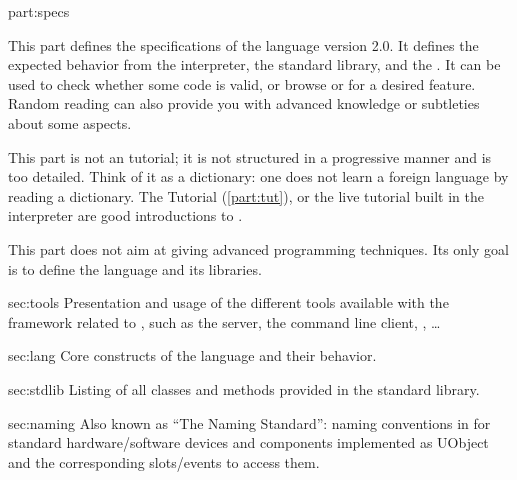 
\begin{partDescription}{part:specs}
  {
    This part defines the specifications of the \us language version
    2.0. It defines the expected behavior from the \us interpreter,
    the standard library, and the \sdk. It can be used to check
    whether some code is valid, or browse \us or \Cxx \api for a
    desired feature. Random reading can also provide you with advanced
    knowledge or subtleties about some \us aspects.

    This part is not an \us tutorial; it is not structured in a
    progressive manner and is too detailed.  Think of it as a
    dictionary: one does not learn a foreign language by reading a
    dictionary. The \us Tutorial (\autoref{part:tut}), or the live \us
    tutorial built in the interpreter are good introductions to \us.

    This part does not aim at giving advanced programming
    techniques. Its only goal is to define the language and its
    libraries.
  }
\item[sec:tools]
  Presentation and usage of the different tools available with the
  \urbi framework related to \us, such as the \urbi server, the
  command line client, \umake, \ldots

\item[sec:lang]
  Core constructs of the language and their behavior.

\item[sec:stdlib]
  Listing of all classes and methods provided in the standard library.

\item[sec:naming]
  Also known as ``The \urbi Naming Standard'': naming conventions in
  for standard hardware/software devices and components implemented as
  UObject and the corresponding slots/events to access them.

\end{partDescription}



